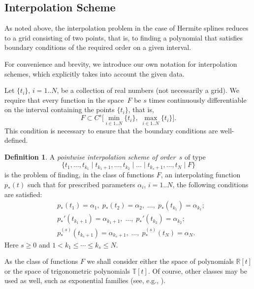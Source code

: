 \documentclass{article}
\theoremstyle{definition}
\theoremstyle{definition}
\newtheorem{definition}{Definition}
\numberwithin{figure}{section}
\newcommand{\1}{\mathbf{1}}
\begin{document}
\subsection{Interpolation Scheme}\label{sec-scheme}

As noted above, the interpolation problem in the case of Hermite splines reduces to a grid consisting of two points, that is, to finding a polynomial that satisfies boundary conditions of the required order on a given interval.

For convenience and brevity, we introduce our own notation for interpolation schemes, which explicitly takes into account the given data.

Let $\{t_i\}$, $i = 1..N$, be a collection of real numbers (not necessarily a grid). We require that every function in the space~$F$ be $s$ times continuously differentiable on the interval containing the points $\{t_i\}$, that is,
\[
    F \subset C^{s}\bigl[\min_{i \in 1..N}\{t_i\},\; \max_{i \in 1..N}\{t_i\}\bigr].
\]
This condition is necessary to ensure that the boundary conditions are well-defined.

\begin{definition}\label{def-interpscheme}
A \emph{pointwise interpolation scheme of order~$s$} of type
\[
    \{t_1,\ldots, t_{k_1}\mid t_{k_1+1},\ldots, t_{k_2}\mid \ldots \mid t_{k_s+1},\ldots, t_N \mid F\}
\]
is the problem of finding, in the class of functions $F$, an interpolating function $p_*(t)$ such that for prescribed parameters $\alpha_i$, $i = 1..N$, the following conditions are satisfied:
\begin{align*}
    &p_*(t_1) = \alpha_1,\; p_*(t_2) = \alpha_2,\; \ldots,\; p_*(t_{k_1}) = \alpha_{k_1};\\[2pt]
    &p_*'(t_{k_1+1}) = \alpha_{k_1+1},\; \ldots,\; p_*'(t_{k_2}) = \alpha_{k_2};\\[2pt]
    &p_*^{(s)}(t_{k_s+1}) = \alpha_{k_s+1},\; \ldots,\; p_*^{(s)}(t_{N}) = \alpha_{N}.
\end{align*}
Here $s \ge 0$ and $1 < k_1 \le \cdots \le k_s \le N$.
\end{definition}

As the class of functions $F$ we shall consider either the space of polynomials $\mathbb{R}[t]$ or the space of trigonometric polynomials $\mathbb{T}[t]$. Of course, other classes may be used as well, such as exponential families (see, e.g., \cite{MccNASA,Massopust2021-tv}).
\end{document}
